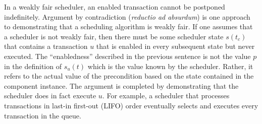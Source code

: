 
In a weakly fair scheduler, an enabled transaction cannot be postponed indefinitely.
Argument by contradiction (\emph{reductio ad absurdum}) is one approach to demonstrating that a scheduling algorithm is weakly fair.
If one assumes that a scheduler is not weakly fair, then there must be some scheduler state $s(t_c)$ that contains a transaction $u$ that is enabled in every subsequent state but never executed.
The ``enabledness'' described in the previous sentence is not the value $p$ in the definition of $s_u(t)$ which is the value known by the scheduler.
Rather, it refers to the actual value of the precondition based on the state contained in the component instance.
The argument is completed by demonstrating that the scheduler does in fact execute $u$.
For example, a scheduler that processes transactions in last-in first-out (LIFO) order eventually selects and executes every transaction in the queue.

